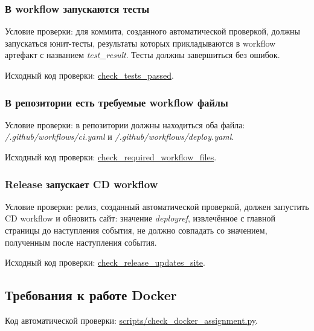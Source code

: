 \documentclass[12pt,a4paper]{article}
\begin{document}
\subsubsection{В workflow запускаются тесты}
\label{sec:tests-passed}
Условие проверки: для коммита, созданного автоматической проверкой, должны запускаться юнит-тесты, результаты которых прикладываются в workflow артефакт с названием \textit{test\_result}.
Тесты должны завершиться без ошибок.

Исходный код проверки: \href{https://github.com/search?q=repo%3Aprafdin%2Fcheck-assignment+check_tests_passed+path%3A%2F%5Echecker%5C%2F%2F&type=code}{check\_tests\_passed}.

\subsubsection{В репозитории есть требуемые workflow файлы}
\label{sec:workflows-exists}
Условие проверки: в репозитории должны находиться оба файла:\newline
\textit{/.github/workflows/ci.yaml} и \textit{/.github/workflows/deploy.yaml}.

Исходный код проверки: \href{https://github.com/search?q=repo%3Aprafdin%2Fcheck-assignment+check_required_workflow_files+NOT+path%3A%2F%5Etests%5C%2F%2F+path%3A%2F%5Echecker%5C%2F%2F&type=code}{check\_required\_workflow\_files}.

\subsubsection{Release запускает CD workflow}
\label{sec:release-trigger-cd}
Условие проверки: релиз, созданный автоматической проверкой, должен запустить CD workflow и обновить сайт: значение \textit{deployref},
извлечённое с главной страницы до наступления события, не должно совпадать со значением, полученным после наступления события.

Исходный код проверки: \href{https://github.com/search?q=repo%3Aprafdin%2Fcheck-assignment+check_release_updates_site+path%3A%2F%5Echecker%5C%2F%2F&type=code}{check\_release\_updates\_site}.

\subsection{Требования к работе Docker}
Код автоматической проверки: \href{https://github.com/search?q=repo%3Aprafdin%2Fcheck-assignment%20check_docker_assignment.py&type=code}
{scripts/check\_docker\_assignment.py}.
\end{document}
